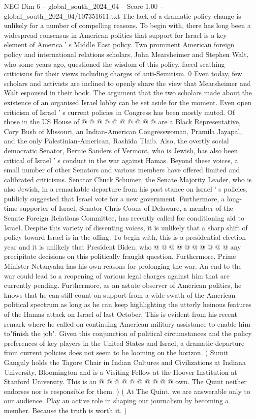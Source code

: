 \begin{textsample}{NEG Dim 6 – global\_south\_2024\_04 – Score 1.00 – global\_south\_2024\_04/107351611.txt}
The lack of a dramatic policy change is unlikely for a number of compelling reasons.
To begin with, there has long been a widespread consensus in American politics that support for Israel is a key element of America ' s Middle East policy.
Two prominent American foreign policy and international relations scholars, John Mearsheimer and Stephen Walt, who some years ago, questioned the wisdom of this policy, faced scathing criticisms for their views including charges of anti-Semitism. 0 Even today, few scholars and activists are inclined to openly share the view that Mearsheimer and Walt espoused in their book.
The argument that the two scholars made about the existence of an organised Israel lobby can be set aside for the moment.
Even open criticism of Israel ' s current policies in Congress has been mostly muted.
Of those in the US House of @ @ @ @ @ @ @ @ @ @ are a Black Representative, Cory Bush of Missouri, an Indian-American Congresswoman, Pramila Jayapal, and the only Palestinian-American, Rashida Tlaib.
Also, the overtly social democratic Senator, Bernie Sanders of Vermont, who is Jewish, has also been critical of Israel ' s conduct in the war against Hamas.
Beyond these voices, a small number of other Senators and various members have offered limited and calibrated criticisms.
Senator Chuck Schumer, the Senate Majority Leader, who is also Jewish, in a remarkable departure from his past stance on Israel ' s policies, publicly suggested that Israel vote for a new government.
Furthermore, a long-time supporter of Israel, Senator Chris Coons of Delaware, a member of the Senate Foreign Relations Committee, has recently called for conditioning aid to Israel.
Despite this variety of dissenting voices, it is unlikely that a sharp shift of policy toward Israel is in the offing.
To begin with, this is a presidential election year and it is unlikely that President Biden, who @ @ @ @ @ @ @ @ @ @ any precipitate decisions on this politically fraught question.
Furthermore, Prime Minister Netanyahu has his own reasons for prolonging the war.
An end to the war could lead to a reopening of various legal charges against him that are currently pending.
Furthermore, as an astute observer of American politics, he knows that he can still count on support from a wide swath of the American political spectrum as long as he can keep highlighting the utterly heinous features of the Hamas attack on Israel of last October.
This is evident from his recent remark where he called on continuing American military assistance to enable him to"finish the job".
Given this conjunction of political circumstances and the policy preferences of key players in the United States and Israel, a dramatic departure from current policies does not seem to be looming on the horizon. ( Sumit Ganguly holds the Tagore Chair in Indian Cultures and Civilizations at Indiana University, Bloomington and is a Visiting Fellow at the Hoover Institution at Stanford University.
This is an @ @ @ @ @ @ @ @ @ @ own.
The Quint neither endorses nor is responsible for them. ) ( At The Quint, we are answerable only to our audience.
Play an active role in shaping our journalism by becoming a member.
Because the truth is worth it. )

\end{textsample}
